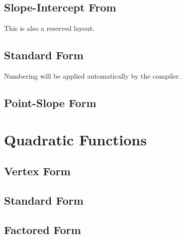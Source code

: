 \documentclass[11pt]{article}
\begin{document}
	\subsection{Slope-Intercept From}
	This is also a reserved layout.
	\subsection{Standard Form}
	Numbering will be applied automatically by the compiler.
	\subsection{Point-Slope Form}
\section{Quadratic Functions}
	\subsection{Vertex Form}
	\subsection{Standard Form}
	\subsection{Factored Form}
\end{document}

